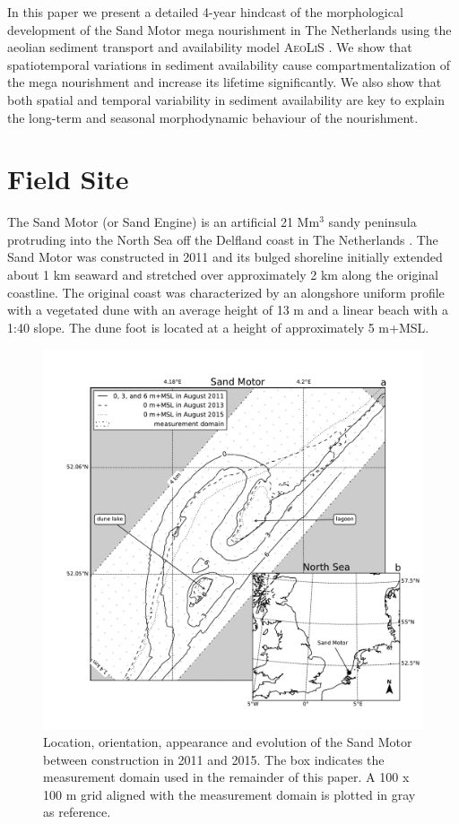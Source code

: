 \documentclass[preprint,12pt,authoryear]{elsarticle}
\begin{document}
In this paper we present a detailed 4-year hindcast of the
morphological development of the Sand Motor mega nourishment in The
Netherlands using the aeolian sediment transport and availability
model \textsc{AeoLiS} \citep{Hoonhout2016}. We show that
spatiotemporal variations in sediment availability cause
compartmentalization of the mega nourishment and increase its lifetime
significantly. We also show that both spatial and temporal variability
in sediment availability are key to explain the long-term and seasonal
morphodynamic behaviour of the nourishment.

\section{Field Site}
\label{sec:fieldsite3}

The Sand Motor (or Sand Engine) is an artificial 21 $\mathrm{Mm^3}$
sandy peninsula protruding into the North Sea off the Delfland coast
in The Netherlands \citep[Figure \ref{fig:fieldsite3},][]{Stive2013}.
The Sand Motor was constructed in 2011 and its bulged shoreline
initially extended about 1 km seaward and stretched over approximately
2 km along the original coastline. The original coast was
characterized by an alongshore uniform profile with a vegetated dune
with an average height of 13 m and a linear beach with a 1:40
slope. The dune foot is located at a height of approximately 5 m+MSL.

\begin{figure}
  \centering
  \includegraphics[width=\columnwidth]{location_and_evolution}
  \caption{Location, orientation, appearance and evolution of the Sand
    Motor between construction in 2011 and 2015. The box indicates the
    measurement domain used in the remainder of this paper. A 100 x
    100 m grid aligned with the measurement domain is plotted in gray
    as reference.}
  \label{fig:fieldsite3}
\end{figure}
\end{document}
